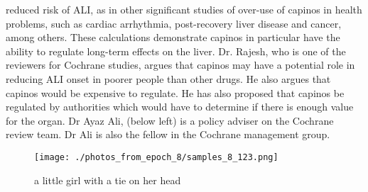 \documentclass{article}%
\begin{document}
reduced risk of ALI, as in other significant studies of over{-}use of capinos in health problems, such as cardiac arrhythmia, post{-}recovery liver disease and cancer, among others. These calculations demonstrate capinos in particular have the ability to regulate long{-}term effects on the liver. Dr. Rajesh, who is one of the reviewers for Cochrane studies, argues that capinos may have a potential role in reducing ALI onset in poorer people than other drugs. He also argues that capinos would be expensive to regulate. He has also proposed that capinos be regulated by authorities which would have to determine if there is enough value for the organ. Dr Ayaz Ali, (below left) is a policy adviser on the Cochrane review team. Dr Ali is also the fellow in the Cochrane management group.\newline%

%


\begin{figure}[h!]%
\centering%
\texttt{[image: ./photos\_from\_epoch\_8/samples\_8\_123.png]}%
\caption{a little girl with a tie on her head}%
\end{figure}

%
\end{document}
